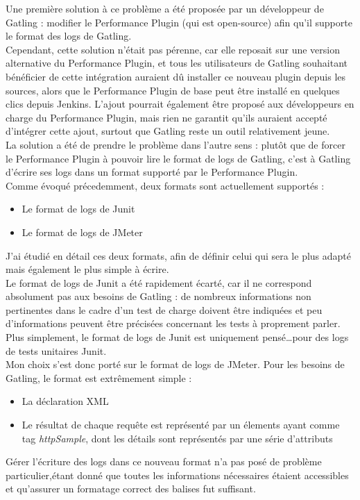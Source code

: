 Une première solution à ce problème a été proposée par un développeur de Gatling : modifier le Performance Plugin (qui est open-source) afin qu'il supporte le format des logs de Gatling.\\
Cependant, cette solution n'était pas pérenne, car elle reposait sur une version \og alternative \fg{} du Performance Plugin, et tous les utilisateurs de Gatling souhaitant bénéficier de cette intégration auraient dû installer ce nouveau plugin depuis les sources, alors que le Performance Plugin de base peut \^etre installé en quelques clics depuis Jenkins. L'ajout pourrait également être proposé aux développeurs en charge du Performance Plugin, mais rien ne garantit qu'ils auraient accepté d'intégrer cette ajout, surtout que Gatling reste un outil relativement jeune.\\

La solution a été de prendre le problème dans l'autre sens : plutôt que de forcer le  Performance Plugin à pouvoir lire le format de logs de Gatling, c'est à Gatling d'écrire ses logs dans un format supporté par le Performance Plugin.\\
Comme évoqué précedemment, deux formats sont actuellement supportés :
\begin{itemize}
	\item Le format de logs de Junit
	\item Le format de logs de JMeter
\end{itemize}
J'ai étudié en détail ces deux formats, afin de définir celui qui sera le plus adapté mais également le plus simple à écrire.\\

Le format de logs de Junit a été rapidement écarté, car il ne correspond absolument pas aux besoins de Gatling : de nombreux informations non pertinentes dans le cadre d'un test de charge doivent être indiquées et peu d'informations peuvent être précisées concernant les tests à proprement parler.\\ Plus simplement, le format de logs de Junit est uniquement pensé\ldots pour des logs de tests unitaires Junit.\\

Mon choix s'est donc porté sur le format de logs de JMeter. Pour les besoins de Gatling, le format est extrêmement simple :
\begin{itemize}
	\item La déclaration XML
	\item Le résultat de chaque requête est représenté par un élements ayant comme tag \textit{httpSample}, dont les détails sont représentés par une série d'attributs
\end{itemize}
Gérer l'écriture des logs dans ce nouveau format n'a pas posé de problème particulier,étant donné que toutes les informations nécessaires étaient accessibles et qu'assurer un formatage correct des balises fut suffisant.\\

